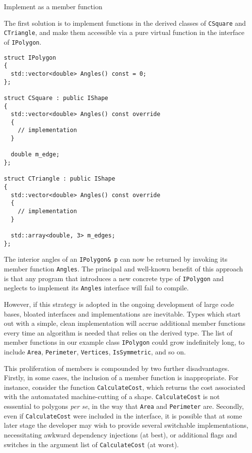 \documentclass[10pt,a4paper,twocolumn]{article}
\newcommand\mycode[1]{{\small\texttt{#1}}}
\begin{document}
\begin{section}{Implement as a member function}

The first solution is to implement functions in the derived classes of \mycode{CSquare} and \mycode{CTriangle}, and make them accessible via a pure virtual function in the interface of \mycode{IPolygon}.

{\small\begin{verbatim}
struct IPolygon
{
  std::vector<double> Angles() const = 0;
};

struct CSquare : public IShape
{
  std::vector<double> Angles() const override
  {
    // implementation
  }

  double m_edge;
};

struct CTriangle : public IShape
{
  std::vector<double> Angles() const override
  {
    // implementation
  }

  std::array<double, 3> m_edges;
};
\end{verbatim}}

The interior angles of an \mycode{IPolygon& p} can now be returned by invoking its member function \mycode{Angles}. The principal and well-known benefit of this approach is that any program that introduces a new concrete type of \mycode{IPolygon} and neglects to implement its \mycode{Angles} interface will fail to compile.

However, if this strategy is adopted in the ongoing development of large code bases, bloated interfaces and implementations are inevitable. Types which start out with a simple, clean implementation will accrue additional member functions every time an algorithm is needed that relies on the derived type.  The list of member functions in our example class \mycode{IPolygon} could grow indefinitely long, to include \mycode{Area}, \mycode{Perimeter}, \mycode{Vertices}, \mycode{IsSymmetric}, and so on. 

This proliferation of members is compounded by two further disadvantages. Firstly, in some cases, the inclusion of a member function is inappropriate. For instance, consider the function \mycode{CalculateCost}, which returns the cost associated with the automatated machine-cutting of a shape. \mycode{CalculateCost} is not esssential to polygons \emph{per se}, in the way that \mycode{Area} and \mycode{Perimeter} are. Secondly, even if \mycode{CalculateCost} were included in the interface, it is possible that at some later stage the developer may wish to provide several switchable implementations, necessitating awkward dependency injections (at best), or additional flags and switches in the argument list of \mycode{CalculateCost} (at worst).


\end{section}
\end{document}
